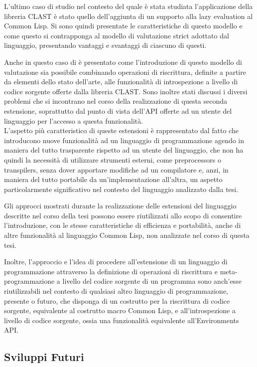 \documentclass{book}
\begin{document}
L'ultimo caso di studio nel contesto del quale è stata studiata l'applicazione
della libreria CLAST è stato quello dell'aggiunta di un supporto alla lazy
evaluation al Common Lisp. Si sono quindi presentate le caratteristiche di
questo modello e come questo si contrapponga al modello di valutazione strict
adottato dal linguaggio, presentando vantaggi e svantaggi di ciascuno di questi.

Anche in questo caso di è presentato come l'introduzione di questo modello di
valutazione sia possibile combinando operazioni di riscrittura, definite a
partire da elementi dello stato dell'arte, alle funzionalità di introspezione a
livello di codice sorgente offerte dalla libreria CLAST. Sono inoltre stati
discussi i diversi problemi che si incontrano nel corso della realizzazione di
questa seconda estensione, soprattutto dal punto di vista dell'API offerte ad un
utente del linguaggio per l'accesso a questa funzionalità.\\

L'aspetto più caratteristico di queste estensioni è rappresentato dal fatto che
introducono nuove funzionalità ad un linguaggio di programmazione agendo in
maniera del tutto trasparente rispetto ad un utente del linguaggio, che non ha
quindi la necessità di utilizzare strumenti esterni, come preprocessors o
transpilers, senza dover apportare modifiche ad un compilatore e, anzi, in
maniera del tutto portabile da un'implementazione all'altra, un aspetto
particolarmente significativo nel contesto del linguaggio analizzato dalla tesi.

Gli approcci mostrati durante la realizzazione delle estensioni del linguaggio
descritte nel corso della tesi possono essere riutilizzati allo scopo di
consentire l'introduzione, con le stesse caratteristiche di efficienza e
portabilità, anche di altre funzionalità al linguaggio Common Lisp, non
analizzate nel corso di questa tesi.

Inoltre, l'approccio e l'idea di procedere all'estensione di un linguaggio di
programmazione attraverso la definizione di operazioni di riscrittura e
meta-programmazione a livello del codice sorgente di un programma sono anch'esse
riutilizzabili nel contesto di qualsiasi altro linguaggio di programmazione,
presente o futuro, che disponga di un costrutto per la riscrittura di codice
sorgente, equivalente al costrutto macro Common Lisp, e all'introspezione a
livello di codice sorgente, ossia una funzionalità equivalente all'Environments
API.

\subsection{Sviluppi Futuri}
\end{document}
